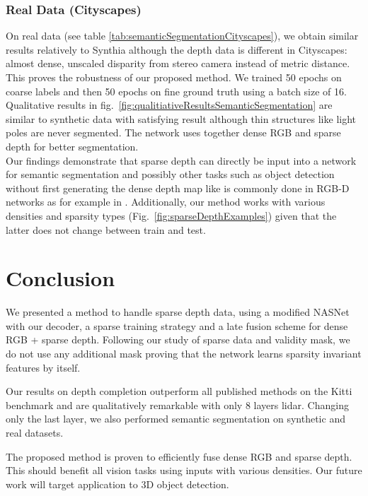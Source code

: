 \documentclass[10pt,twocolumn,letterpaper]{article}
\begin{document}
\subsubsection{Real Data (Cityscapes)}
On real data (see table \ref{tab:semanticSegmentationCityscapes}), we obtain similar results relatively to Synthia although the depth data is different in Cityscapes: almost dense, unscaled disparity from stereo camera instead of metric distance.
This proves the robustness of our proposed method.
We trained 50 epochs on coarse labels and then 50 epochs on fine ground truth using a batch size of 16.
Qualitative results in fig.~\ref{fig:qualitiativeResultsSemanticSegmentation} are similar to synthetic data with satisfying result although thin structures like light poles are never segmented.
The network uses together dense RGB and sparse depth for better segmentation.
\\

Our findings demonstrate that sparse depth can directly be input into a network for semantic segmentation and possibly other tasks such as object detection without first generating the dense depth map like is commonly done in RGB-D networks as for example in \cite{gupta2014learning}.
Additionally, our method works with various densities and sparsity types (Fig.~\ref{fig:sparseDepthExamples}) given that the latter does not change between train and test.


\section{Conclusion}

We presented a method to handle sparse depth data, using a modified NASNet \cite{zoph2017learning} with our decoder, a sparse training strategy and a late fusion scheme for dense RGB + sparse depth.
Following our study of sparse data and validity mask, we do not use any additional mask proving that the network learns sparsity invariant features by itself.

Our results on depth completion outperform all published methods on the Kitti benchmark and are qualitatively remarkable with only 8 layers lidar.
Changing only the last layer, we also performed semantic segmentation on synthetic and real datasets.

The proposed method is proven to efficiently fuse dense RGB and sparse depth. This should benefit all vision tasks using inputs with various densities. Our future work will target application to 3D object detection.


{\small


}
\end{document}
